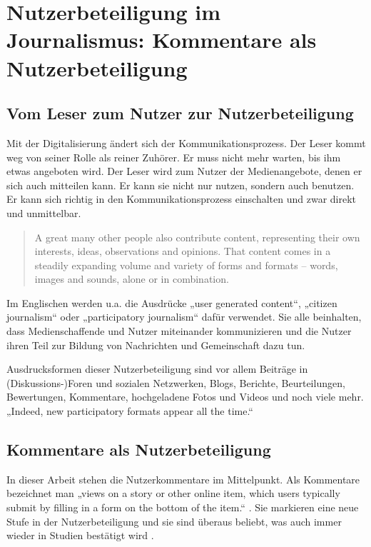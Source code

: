 \chapter{Nutzerbeteiligung im Journalismus: Kommentare als Nutzerbeteiligung}
\label{kap:nutzerbeteiligung}

\section{Vom Leser zum Nutzer zur Nutzerbeteiligung}

Mit der Digitalisierung ändert sich der Kommunikationsprozess. Der Leser kommt
weg von seiner Rolle als reiner Zuhörer. Er muss nicht mehr warten, bis ihm
etwas angeboten wird. Der Leser wird zum Nutzer der Medienangebote, denen er
sich auch mitteilen kann. Er kann sie nicht nur nutzen, sondern auch benutzen.
Er kann sich richtig in den Kommunikationsprozess einschalten und zwar direkt
und unmittelbar.

\begin{quote}
\glqq A great many other people also contribute content, representing their own
interests, ideas, observations and opinions. That content comes in a steadily
expanding volume and variety of forms and formats – words, images and sounds,
alone or in combination.\grqq{} \autocite[S.~1]{participatory}
\end{quote}

Im Englischen werden u.a. die Ausdrücke „user generated content“, „citizen
journalism“ oder „participatory journalism“ \autocite[S.~2]{participatory} dafür
verwendet. Sie alle beinhalten, dass Medienschaffende und Nutzer miteinander
kommunizieren und die Nutzer ihren Teil zur Bildung von Nachrichten und
Gemeinschaft dazu tun.

Ausdrucksformen dieser Nutzerbeteiligung sind vor allem Beiträge in
(Diskussions-)Foren und sozialen Netzwerken, Blogs, Berichte, Beurteilungen,
Bewertungen, Kommentare, hochgeladene Fotos und Videos und noch viele mehr.
„Indeed, new participatory formats appear all the time.“ \autocite[S.~2 und
S.~17]{participatory}


\section{Kommentare als Nutzerbeteiligung}

In dieser Arbeit stehen die Nutzerkommentare im Mittelpunkt. Als Kommentare
bezeichnet man „views on a story or other online item, which users typically
submit by filling in a form on the bottom of the item.“
\autocite[S.~17]{participatory}.  Sie markieren eine neue Stufe in der
Nutzerbeteiligung und sie sind überaus beliebt, was auch immer wieder in Studien
bestätigt wird \autocite[S.~97, siehe 3.1]{reich}.

